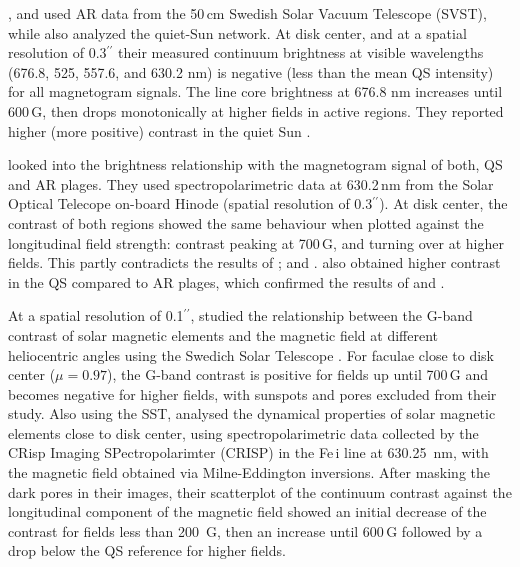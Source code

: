 \documentclass[goettingen, gauss, print]{thesis}
\begin{document}
\citet{title_differences_1992}, \citet{topka_properties_1992} and \citet{lawrence_contrast_1993} used AR data from the 50\,cm Swedish Solar Vacuum Telescope (SVST), while \citet{lawrence_contrast_1993} also analyzed the quiet-Sun network.
At disk center, and at a spatial resolution of 0.3$^{\prime\prime}$ their measured continuum brightness at visible wavelengths (676.8, 525, 557.6, and 630.2 nm) is negative (less than the mean QS intensity) for all magnetogram signals. The line core brightness at 676.8 nm increases until 600\,G, then drops monotonically at higher fields in active regions.
They reported higher (more positive) contrast in the quiet Sun \citep{lawrence_contrast_1993}.

\citet{kobel_continuum_2011} looked into the brightness relationship with the magnetogram signal of both, QS and AR plages. They used spectropolarimetric data at 630.2\,nm  from the Solar Optical Telecope on-board Hinode (spatial resolution of 0.3$^{\prime\prime}$). At disk center, the contrast of both regions showed the same behaviour when plotted against the longitudinal field strength: contrast peaking at 700\,G, and turning over at higher fields. This partly contradicts the results of \cite{title_differences_1992}; \cite{topka_properties_1992} and \cite{lawrence_contrast_1993}. \citet{kobel_continuum_2011} also obtained higher contrast in the QS compared to AR plages, which confirmed the results of \cite{title_differences_1992} and \cite{lawrence_contrast_1993}.

At a spatial resolution of 0.1$^{\prime\prime}$, \citet{berger_contrast_2007} studied the relationship between the G-band contrast of solar magnetic elements and the magnetic field at different heliocentric angles using the Swedich Solar Telescope \citep[SST,][]{scharmer_1-meter_2003}. For faculae close to disk center ($\mu=0.97$), the G-band contrast is positive for fields up until 700\,G and becomes negative for higher fields, with sunspots and pores excluded from their study.
Also using the SST, \citet{narayan_small-scale_2010} analysed the dynamical properties of solar magnetic elements close to disk center, using spectropolarimetric data collected by the CRisp Imaging SPectropolarimter (CRISP) in the Fe\,{\sc i} line at 630.25\, nm, with the magnetic field obtained via Milne-Eddington inversions. After masking the dark pores in their images, their scatterplot of the continuum contrast against the longitudinal component of the magnetic field showed an initial decrease of the contrast for fields less than 200\, G, then an increase until 600\,G followed by a drop  below the QS reference for higher fields.
\end{document}
